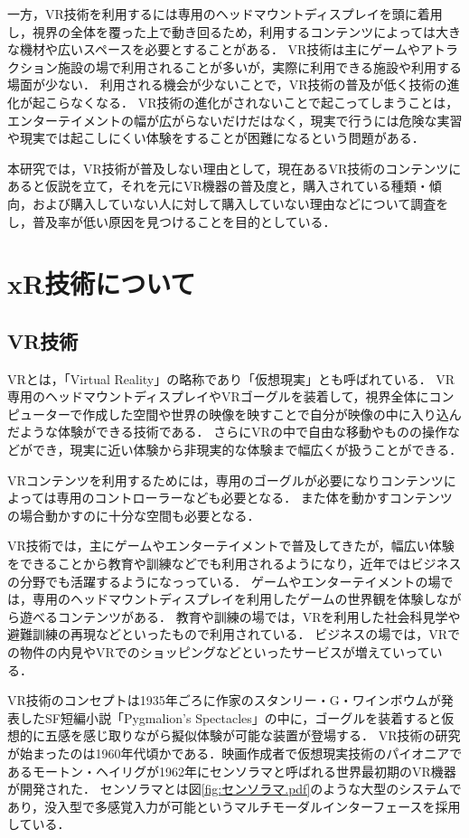 \documentclass[12pt,a4j]{ltjsarticle}
\begin{document}
一方，VR技術を利用するには専用のヘッドマウントディスプレイを頭に着用し，視界の全体を覆った上で動き回るため，利用するコンテンツによっては大きな機材や広いスペースを必要とすることがある．
VR技術は主にゲームやアトラクション施設の場で利用されることが多いが，実際に利用できる施設や利用する場面が少ない．
利用される機会が少ないことで，VR技術の普及が低く技術の進化が起こらなくなる．
VR技術の進化がされないことで起こってしまうことは，エンターテイメントの幅が広がらないだけだはなく，現実で行うには危険な実習や現実では起こしにくい体験をすることが困難になるという問題がある．

本研究では，VR技術が普及しない理由として，現在あるVR技術のコンテンツにあると仮説を立て，それを元にVR機器の普及度と，購入されている種類・傾向，および購入していない人に対して購入していない理由などについて調査をし，普及率が低い原因を見つけることを目的としている．


\section{xR技術について}
\subsection{VR技術}
VRとは，「Virtual Reality」の略称であり「仮想現実」とも呼ばれている．
VR専用のヘッドマウントディスプレイやVRゴーグルを装着して，視界全体にコンピューターで作成した空間や世界の映像を映すことで自分が映像の中に入り込んだような体験ができる技術である．
さらにVRの中で自由な移動やものの操作などができ，現実に近い体験から非現実的な体験まで幅広くが扱うことができる．

VRコンテンツを利用するためには，専用のゴーグルが必要になりコンテンツによっては専用のコントローラーなども必要となる．
また体を動かすコンテンツの場合動かすのに十分な空間も必要となる．

VR技術では，主にゲームやエンターテイメントで普及してきたが，幅広い体験をできることから教育や訓練などでも利用されるようになり，近年ではビジネスの分野でも活躍するようになっっている．
ゲームやエンターテイメントの場では，専用のヘッドマウントディスプレイを利用したゲームの世界観を体験しながら遊べるコンテンツがある．
教育や訓練の場では，VRを利用した社会科見学や避難訓練の再現などといったもので利用されている．
ビジネスの場では，VRでの物件の内見やVRでのショッピングなどといったサービスが増えていっている．

VR技術のコンセプトは1935年ごろに作家のスタンリー・G・ワインボウムが発表したSF短編小説「Pygmalion’s Spectacles」の中に，ゴーグルを装着すると仮想的に五感を感じ取りながら擬似体験が可能な装置が登場する．
VR技術の研究が始まったのは1960年代頃かである．映画作成者で仮想現実技術のパイオニアであるモートン・ヘイリグが1962年にセンソラマと呼ばれる世界最初期のVR機器が開発された．
センソラマとは図\ref{fig:センソラマ.pdf}のような大型のシステムであり，没入型で多感覚入力が可能というマルチモーダルインターフェースを採用している．
\end{document}
